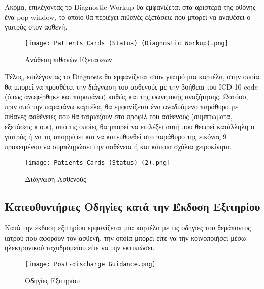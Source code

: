 \documentclass{article}
\begin{document}
\newpage

\par Ακόμα, επιλέγοντας το Diagnostic Workup θα εμφανίζεται στα αριστερά της οθόνης ένα pop-window, το οποίο θα περιέχει πιθανές εξετάσεις που μπορεί να αναθέσει ο γιατρός στον ασθενή.

\begin{figure}[!htb]
\centering
\texttt{[image: Patients Cards (Status) (Diagnostic Workup).png]}
\caption{\label{fig:Diagnostic Workup} Ανάθεση πιθανών Εξετάσεων }
\end{figure}

\vspace{0.3cm}

Τέλος, επιλέγοντας το Diagnosis θα εμφανίζεται στον γιατρό μια καρτέλα, στην οποία θα μπορεί να προσθέτει την διάγνωση του ασθενούς με την βοήθεια του ICD-10 code (όπως αναφέρθηκε και παραπάνω) καθώς και της φωνητικής αναζήτησης. Ωστόσο, πριν από την παραπάνω καρτέλα, θα εμφανίζεται ένα αναδυόμενο παράθυρο με πιθανές ασθένειες που θα ταιριάζουν στο προφίλ του ασθενούς (συμπτώματα, εξετάσεις κ.ο.κ), από τις οποίες θα μπορεί να επιλέξει αυτή που θεωρεί κατάλληλη ο γιατρός ή να τις απορρίψει και να κατευθυνθεί στο παράθυρο της εικόνας 9 προκειμένου να συμπληρώσει την ασθένεια ή και κάποια σχόλια χειροκίνητα. 

\vspace{0.3cm}

\begin{figure}[!htb]
\centering
\texttt{[image: Patients Cards (Status) (2).png]}
\caption{\label{fig:Diagnosis} Διάγνωση Ασθενούς }
\end{figure}

\newpage

\subsection{Κατευθυντήριες Οδηγίες κατά την Έκδοση Εξιτηρίου}
Κατά την έκδοση εξιτηρίου εμφανίζεται μία καρτέλα με τις οδηγίες του θεράποντος ιατρού που αφορούν τον ασθενή, την οποία μπορεί είτε να την κοινοποιήσει μέσω ηλεκτρονικού ταχυδρομείου είτε να την εκτυπώσει.

\begin{figure}[!htb]
\centering
\texttt{[image: Post-discharge Guidance.png]}
\caption{\label{fig:discharge guide} Οδηγίες Εξιτηρίου}
\end{figure}
\end{document}
